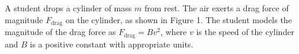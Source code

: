 \documentclass{../../../oss-apphys-exam}
\begin{document}
\begin{questions}
%    
%    
%
%

  \question A student drops a cylinder of mass $m$ from rest. The air exerts a
  drag force of magnitude $F_\text{drag}$ on the cylinder, as shown in Figure 1.
  The student models the magnitude of the drag force as $F_\text{drag} = Bv^2$,
  where $v$ is the speed of the cylinder and $B$ is a positive constant with
  appropriate units.
  \begin{parts}

\end{parts}
\end{questions}
\end{document}
